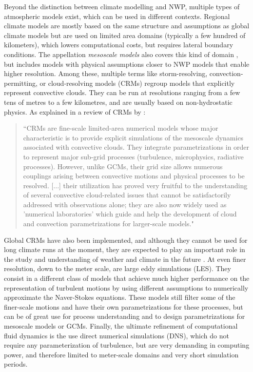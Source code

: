 Beyond the distinction between climate modelling and NWP, multiple types of atmospheric models exist, which can be used in different contexts.
Regional climate models are mostly based on the same structure and assumptions as global climate models but are used on limited area domains (typically a few hundred of kilometers), which lowers computational costs, but requires lateral boundary conditions.
The appellation \textit{mesoscale models} also covers this kind of domain \citep[mesoscale meteorological processes usually range from 10 to 200 km,][]{malardel2005fondamentaux}, but includes models with physical assumptions closer to NWP models that enable higher resolution.
Among these, multiple terms like storm-resolving, convection-permitting, or cloud-resolving models (CRMs) regroup models that explicitly represent convective clouds. They can be run at resolutions ranging from a few tens of metres to a few kilometres, and are usually based on non-hydrostatic physics.
As explained in a review of CRMs by \citet{guichard_short_2017}:
\begin{quote}
    ``CRMs are fine-scale limited-area numerical models whose major characteristic is to provide explicit simulations of the mesoscale dynamics associated with convective clouds. They integrate parametrizations in order to represent major sub-grid processes (turbulence, microphysics, radiative processes). However, unlike GCMs, their grid size allows numerous couplings arising between convective motions and physical processes to be resolved. [...] their utilization has proved very fruitful to the understanding of several convective cloud-related issues that cannot be satisfactorily addressed with observations alone; they are also now widely used as 'numerical laboratories' which guide and help the development of cloud and convection parametrizations for larger-scale models."
\end{quote}
Global CRMs have also been implemented, and although they cannot be used for long climate runs at the moment, they are expected to play an important role in the study and understanding of weather and climate in the future \citep{satoh_global_2019}.
At even finer resolution, down to the meter scale, are large eddy simulations (LES). They consist in a different class of models that achieve much higher performance on the representation of turbulent motions by using different assumptions to numerically approximate the Naver-Stokes equations. These models still filter some of the finer-scale motions and have their own parametrizations for these processes, but can be of great use for process understanding and to design parametrizations for mesoscale models or GCMs. 
Finally, the ultimate refinement of computational fluid dynamics is the use direct numerical simulations (DNS), which do not require any parameterization of turbulence, but are very demanding in computing power, and therefore limited to meter-scale domains and very short simulation periods.

